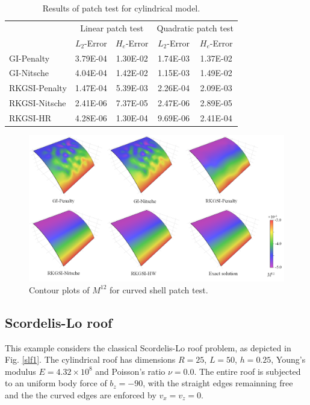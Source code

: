 \begin{table}[!ht]
\centering
\caption{Results of patch test for cylindrical model.}\label{ptt2}
\begin{tabular}{lcccc}
\toprule
 & \multicolumn{2}{c}{Linear patch test} & \multicolumn{2}{c}{Quadratic patch test} \\ \cline{2-5}
 & $L_2$-Error & $H_e$-Error & $L_2$-Error & $H_e$-Error \\
    \midrule
    GI-Penalty & 3.79E-04 & 1.30E-02 & 1.74E-03 & 1.37E-02 \\
    GI-Nitsche & 4.04E-04 & 1.42E-02 & 1.15E-03 & 1.49E-02 \\
    RKGSI-Penalty & 1.47E-04 & 5.39E-03 & 2.26E-04 & 2.09E-03 \\
    RKGSI-Nitsche & 2.41E-06 & 7.37E-05 & 2.47E-06 & 2.89E-05 \\
    RKGSI-HR & 4.28E-06 & 1.30E-04 & 9.69E-06 & 2.41E-04 \\
    \bottomrule
\end{tabular}
\end{table}

\begin{figure}[!ht]
\centering
\includegraphics[width=\textwidth]{figures/ptc}
\caption{Contour plots of $M^{12}$ for curved shell patch test.}\label{ptf2}
\end{figure}

\subsection{Scordelis-Lo roof}
This example considers the classical Scordelis-Lo roof problem, as depicted in Fig. \ref{slf1}. The cylindrical roof has dimensions $R=25$, $L=50$, $h=0.25$, Young's modulus $E=4.32\times 10^8$ and Poisson's ratio $\nu=0.0$. The entire roof is subjected to an uniform body force of $b_z = -90$, with the straight edges remainning free and the the curved edges are enforced by $v_x=v_z=0$.


